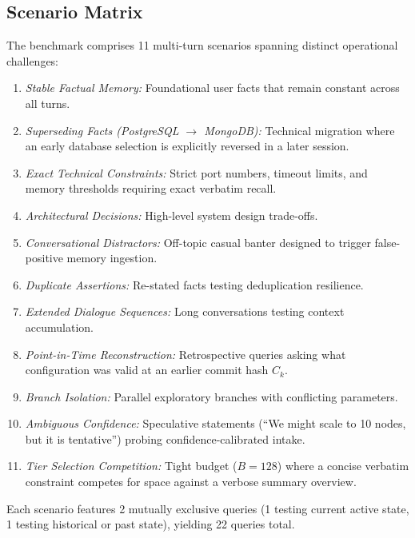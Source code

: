 \subsection{Scenario Matrix}
The benchmark comprises 11 multi-turn scenarios spanning distinct operational challenges:
\begin{enumerate}
    \item \textit{Stable Factual Memory:} Foundational user facts that remain constant across all turns.
    \item \textit{Superseding Facts (PostgreSQL $\to$ MongoDB):} Technical migration where an early database selection is explicitly reversed in a later session.
    \item \textit{Exact Technical Constraints:} Strict port numbers, timeout limits, and memory thresholds requiring exact verbatim recall.
    \item \textit{Architectural Decisions:} High-level system design trade-offs.
    \item \textit{Conversational Distractors:} Off-topic casual banter designed to trigger false-positive memory ingestion.
    \item \textit{Duplicate Assertions:} Re-stated facts testing deduplication resilience.
    \item \textit{Extended Dialogue Sequences:} Long conversations testing context accumulation.
    \item \textit{Point-in-Time Reconstruction:} Retrospective queries asking what configuration was valid at an earlier commit hash $C_k$.
    \item \textit{Branch Isolation:} Parallel exploratory branches with conflicting parameters.
    \item \textit{Ambiguous Confidence:} Speculative statements (``We might scale to 10 nodes, but it is tentative'') probing confidence-calibrated intake.
    \item \textit{Tier Selection Competition:} Tight budget ($B=128$) where a concise verbatim constraint competes for space against a verbose summary overview.
\end{enumerate}
Each scenario features 2 mutually exclusive queries (1 testing current active state, 1 testing historical or past state), yielding 22 queries total.


